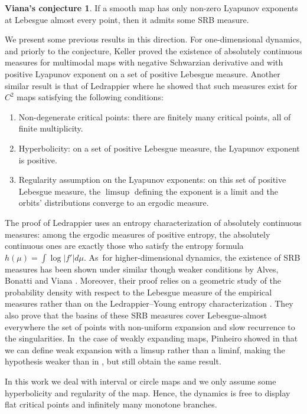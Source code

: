 \documentclass[11pt]{article}
\newenvironment{enumeratei}
{\bgroup\def\theenumi{\roman{enumi}}\def\theenumii{\arabic{enumii}}\begin{enumerate}}
{\end{enumerate}\egroup}
\let\rC C
\theoremstyle{definition}
\newtheorem*{conj*}{Viana's conjecture}
\begin{document}
\begin{conj*}
If a smooth map has only non-zero Lyapunov exponents at Lebesgue almost every point, then it admits some SRB measure.
\end{conj*}

We present some previous results in this direction. For one-dimensional dynamics, and priorly to the conjecture, Keller \cite{Keller_1990} proved the existence of absolutely continuous measures for multimodal maps with negative Schwarzian derivative and with positive Lyapunov exponent on a set of positive Lebesgue measure.
Another similar result is that of Ledrappier \cite{Ledrappier_1981} where he showed that such measures exist for $\rC^2$ maps satisfying the following conditions:
\begin{enumeratei}
\item
Non-degenerate critical points: there are finitely many critical points, all of finite multiplicity.
\item
Hyperbolicity: on a set of positive Lebesgue measure, the Lyapunov exponent is positive.
\item
Regularity assumption on the Lyapunov exponents: on this set of positive Lebesgue measure, the $\limsup$ defining the exponent is a limit and the orbits' distributions converge to an ergodic measure.
\end{enumeratei}

The proof of Ledrappier uses an entropy characterization of absolutely continuous measures: among the ergodic measures of positive entropy, the absolutely continuous ones are exactly those who satisfy the entropy formula $h(\mu) = \int \log |f'| d \mu$. As~for higher-dimensional dynamics, the existence of SRB measures has been shown under similar though weaker conditions by Alves, Bonatti and Viana \cite{Alves2000}.
Moreover, their proof relies on a geometric study of the probability density with respect to the Lebesgue measure of the empirical measures rather than on the Ledrappier--Young entropy characterization \cite{Ledrappier_Young_1985a,Ledrappier_Young_1985b}.
They also prove that the basins of these SRB measures cover Lebesgue-almost everywhere the set of points with non-uniform expansion and slow recurrence to the singularities. In~the case of weakly expanding maps, Pinheiro showed in \cite{Pinheiro_2006,Pinheiro2011} that we can define weak expansion with a limsup rather than a liminf, making the hypothesis weaker than in \cite{Alves2000}, but still obtain the same result.

In this work we deal with interval or circle maps and we only assume some hyperbolicity and regularity of the map.
Hence, the dynamics is free to display flat critical points and infinitely many monotone branches.
\end{document}
